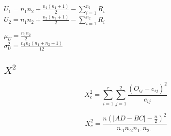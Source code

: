 \documentclass[12pt]{article}
\newcommand{\X}{\mathscr{X}}
\begin{document}
\begin{center}
\begin{tcolorbox}[colback=white,colframe=black,width=15cm ,coltitle=white]
\begin{multicols}{2} 
\large{
\begin{center}
\large{
$U_{1} = n_1 n_2 +\frac{n_1(n_1+1)}{2} - \sum_{i=1}^{n_1} R_i$ \\
$U_{2}=  n_1 n_2 +\frac{n_2(n_2+1)}{2} - \sum_{i=1}^{n_2} R_i$
}
\end{center}}
\end{multicols} 
\end{tcolorbox}
\end{center}



\begin{center}
\begin{tcolorbox}[colback=white,colframe=black,width=14cm ,coltitle=white]
\begin{multicols}{2} 
\large{
\begin{center}
\large{
$\mu_{U} = \frac{n_1 n_2}{2}$\\
$\sigma^2_{U}= \frac{n_1 n_2(n_1 + n_2 + 1)}{12}$
}
\end{center}}
\end{multicols} 
\end{tcolorbox}
\end{center}




\subsection*{\mbox{\boldmath $X^2$}}
\begin{center}
\begin{tcolorbox}[colback=white,colframe=black,width=8.5cm ,coltitle=white]
$$
X^2_{c} = \sum^{r}_{i=1} \sum^{2}_{j=1} \frac{(O_{ij} - e_{ij})^2}{e_{ij}}$$
\end{tcolorbox}
\end{center}

\begin{center}
\begin{tcolorbox}[colback=white,colframe=black,width=8cm ,coltitle=white]
$$
X^2_{c} =\frac{n(\left | AD-BC \right | - \frac{n}{2})^2}{n_{\cdot 1}n_{\cdot 2}n_{1 \cdot}n_{2 \cdot}}$$
\end{tcolorbox}
\end{center}

\end{document}
